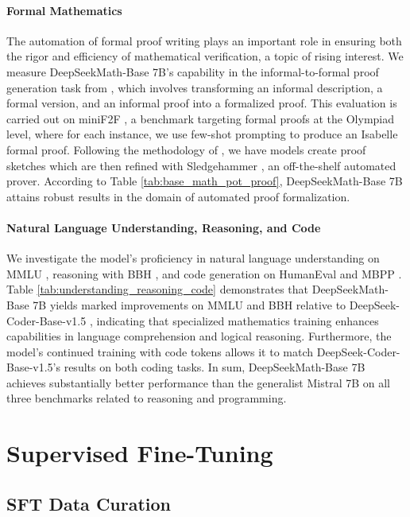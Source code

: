 \paragraph{Formal Mathematics}

The automation of formal proof writing plays an important role in ensuring both the rigor and efficiency of mathematical verification, a topic of rising interest. We measure DeepSeekMath-Base 7B’s capability in the informal-to-formal proof generation task from \citep{dsp_proof}, which involves transforming an informal description, a formal version, and an informal proof into a formalized proof. This evaluation is carried out on miniF2F \citep{minif2f}, a benchmark targeting formal proofs at the Olympiad level, where for each instance, we use few-shot prompting to produce an Isabelle formal proof. Following the methodology of \cite{dsp_proof}, we have models create proof sketches which are then refined with Sledgehammer \citep{sledgehammer}, an off-the-shelf automated prover. According to Table \ref{tab:base_math_pot_proof}, DeepSeekMath-Base 7B attains robust results in the domain of automated proof formalization.

\paragraph{Natural Language Understanding, Reasoning, and Code}

We investigate the model’s proficiency in natural language understanding on MMLU \citep{mmlu}, reasoning with BBH \citep{bbh}, and code generation on HumanEval \citep{codex} and MBPP \citep{mbpp}. Table \ref{tab:understanding_reasoning_code} demonstrates that DeepSeekMath-Base 7B yields marked improvements on MMLU and BBH relative to DeepSeek-Coder-Base-v1.5 \citep{deepseek-coder}, indicating that specialized mathematics training enhances capabilities in language comprehension and logical reasoning. Furthermore, the model’s continued training with code tokens allows it to match DeepSeek-Coder-Base-v1.5’s results on both coding tasks. In sum, DeepSeekMath-Base 7B achieves substantially better performance than the generalist Mistral 7B \citep{mistral} on all three benchmarks related to reasoning and programming.

\section{Supervised Fine-Tuning}

\subsection{SFT Data Curation}

